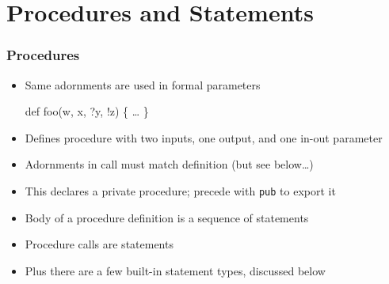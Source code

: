 \documentclass[12pt]{beamer}
\begin{document}
\section{Procedures and Statements}

\begin{frame}[fragile]
\frametitle{Procedures}
\begin{itemize}
\item Same adornments are used in formal parameters \\[-1ex]
  \begin{minipage}{0.95\linewidth}
    \begin{block}{}
\begin{semiverbatim}
def foo(w, x, \alert{?}y, \alert{!}z) \{
    \ldots
\}
\end{semiverbatim}
    \end{block}
  \end{minipage}
\item Defines procedure with two
  inputs, one output, and one in-out parameter
\item Adornments in call must match definition (but see below\ldots)
\item This declares a private procedure; precede with \alert{\texttt{pub}}
  to export it
\item Body of a procedure definition is a sequence of
  statements
\item Procedure calls are statements
\item Plus there are a few built-in statement types, discussed below
\end{itemize}
\end{frame}
\end{document}
